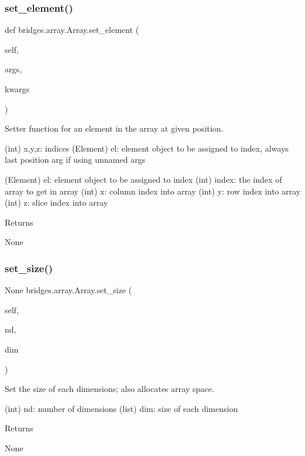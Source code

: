 \subsubsection{\texorpdfstring{set\_element()}{set\_element()}}
{\footnotesize\ttfamily def bridges.\+array.\+Array.\+set\+\_\+element (\begin{DoxyParamCaption}\item[{}]{self,  }\item[{$\ast$}]{args,  }\item[{$\ast$$\ast$}]{kwargs }\end{DoxyParamCaption})}



Setter function for an element in the array at given position. 

\begin{DoxyVerb}       (int) x,y,z: indices
       (Element) el: element object to be assigned to index, always last position arg if using unnamed args

       (Element) el: element object to be assigned to index
       (int) index: the index of array to get in array
       (int) x: column index into array
       (int) y: row index into array
       (int) z: slice index into array
\end{DoxyVerb}
 \begin{DoxyReturn}{Returns}


None 
\end{DoxyReturn}
\mbox{\label{classbridges_1_1array_1_1_array_aa503ee9a06a60ddf8acb9e5dc49c820a}} 
\subsubsection{\texorpdfstring{set\_size()}{set\_size()}}
{\footnotesize\ttfamily  None bridges.\+array.\+Array.\+set\+\_\+size (\begin{DoxyParamCaption}\item[{}]{self,  }\item[{int}]{nd,  }\item[{list}]{dim }\end{DoxyParamCaption})}



Set the size of each dimensions; also allocates array space. 

\begin{DoxyVerb}       (int) nd: number of dimensions
       (list) dim: size of each dimension
\end{DoxyVerb}
 \begin{DoxyReturn}{Returns}


None 
\end{DoxyReturn}
\mbox{\label{classbridges_1_1array_1_1_array_a479be9c2ec7aace6db3bec8b48a53ac7}} 
